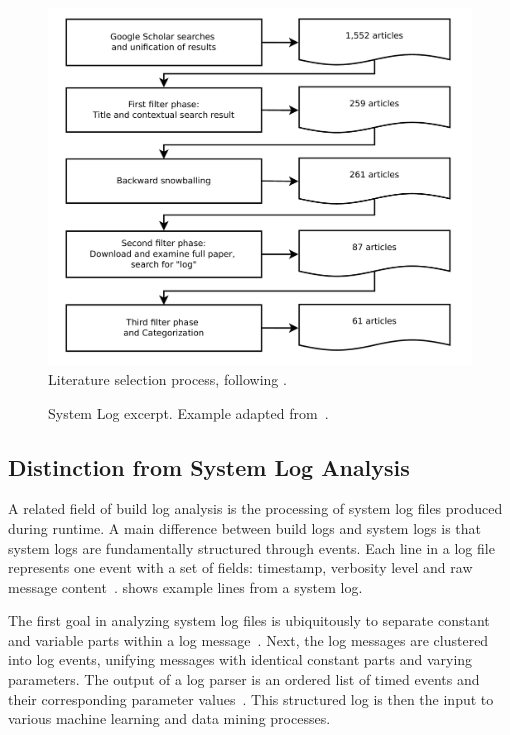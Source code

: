 \begin{figure}[tb]
	\centering
	\includegraphics[width=\columnwidth, clip]{img/lit_survey.pdf}
	\caption{Literature selection process, following
	\cite{petersen2015guidelines}.}
	\label{fig:lit-survey}
\end{figure}


\begin{figure}[b]
  \centering
  
  \caption{System Log excerpt.
Example adapted from~\cite{he2017towards}.}
  \label{lst:system-log}
\end{figure}

\subsection{Distinction from System Log Analysis}
\label{sec:system-log-analysis}
A related field of build log analysis is the processing of system log
files produced during runtime.
A main difference between build logs
and system logs is that system logs are fundamentally structured
through events.
Each line in a log file represents one event with a
set of fields: timestamp, verbosity level and raw message
content~\cite{he2017towards}.
 shows
example lines from a system log.

The first goal in analyzing system log files is ubiquitously to
separate constant and variable parts within a log
message~\cite{nagappan2010abstracting,he2017towards}.
Next, the log
messages are clustered into log events, unifying messages with
identical constant parts and varying parameters.
The output of a log
parser is an ordered list of timed events and their corresponding
parameter values~\cite{he2016evaluation}.
This structured log is then
the input to various machine learning and data mining processes.

